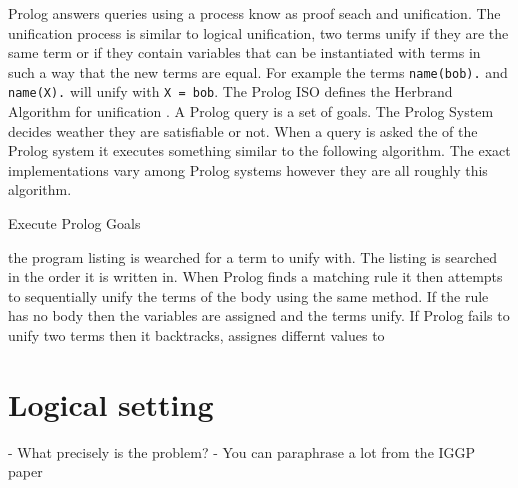 \documentclass[a4paper,12pt]{report}
\begin{document}
Prolog answers queries using a process know as proof seach and unification. The unification process is similar to logical unification, two terms unify if they are the same term or if they contain variables that can be instantiated with terms in such a way that the new terms are equal. For example the terms \texttt{name(bob).} and \texttt{name(X).} will unify with \texttt{X = bob}. The Prolog ISO defines the Herbrand Algorithm for unification \cite{PrologISO}. A Prolog query is a set of goals. The Prolog System decides weather they are satisfiable or not. When a query is asked the of the Prolog system it executes something similar to the following algorithm. The exact implementations vary among Prolog systems however they are all roughly this algorithm. 
\begin{algorithm}
\caption{Execute Prolog Goals}
\end{algorithm}

the program listing is wearched for a term to unify with. The listing is searched in the order it is written in. When Prolog finds a matching rule it then attempts to sequentially unify the terms of the body using the same method. If the rule has no body then the variables are assigned and the terms unify. If Prolog fails to unify two terms then it backtracks, assignes differnt values to \cite{Bratko}

\chapter{Logical setting}\label{LogicalSetting}
    - What precisely is the problem?
    - You can paraphrase a lot from the IGGP paper
\end{document}
